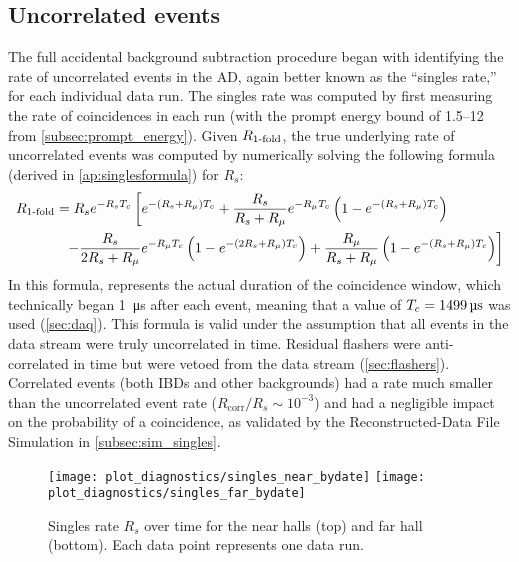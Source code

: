 \subsection{Uncorrelated events}
\label{subsec:singles}

The full accidental background subtraction procedure began with identifying
the rate of uncorrelated events in the AD, again better known
as the ``singles rate,'' for each individual data run.
The singles rate was computed by first measuring the rate of
 coincidences in each run
(with the prompt energy bound of \SIrange{1.5}{12}{\mev} from \cref{subsec:prompt_energy}).
Given $R_\text{\ensuremath{1}-fold}$, the true underlying rate of uncorrelated events was
computed by numerically solving the following formula
(derived in \cref{ap:singlesformula}) for $R_s$:
\begin{align}
    \label{eq:rsingles}
    \begin{split}
        R_{\text{\fold{1}}}
          &= R_s e^{-R_s\tc}
          \left[
              e^{-(R_s + R_\mu)\tc} +
              \frac{R_s}{R_s+R_\mu} e^{-R_\mu\tc}
              \left(
                  1 - e^{-(R_s + R_\mu)\tc}
              \right)
          \right. \\
          &\ \ %
          \left. - \frac{R_s}{2R_s + R_\mu} e^{-R_\mu\tc}
              \left(
                  1 - e^{-(2R_s + R_\mu)\tc}
              \right) +
              \frac{R_\mu}{R_s + R_\mu}
              \left(
                  1 - e^{-(R_s + R_\mu)\tc}
              \right)
          \right]
    \end{split}
\end{align}
In this formula, \tc{} represents the actual duration of the coincidence window,
which technically began \SI{1}{\micro\second} after each event,
meaning that a value of $T_c=\SI{1499}{\micro\second}$ was used (\cref{sec:daq}).
This formula is valid under the assumption that all
events in the data stream were truly uncorrelated in time.
Residual flashers were anti-correlated in time
but were vetoed from the data stream (\cref{sec:flashers}).
Correlated events (both IBDs and other backgrounds)
had a rate much smaller than the uncorrelated event rate
($R_{\text{corr}}/R_s \sim 10^{-3}$)
and had a negligible impact on the probability of a  coincidence,
as validated by the Reconstructed-Data File Simulation in \cref{subsec:sim_singles}.

\begin{figure}
    \centering
    \texttt{[image: plot\_diagnostics/singles\_near\_bydate]}
    \texttt{[image: plot\_diagnostics/singles\_far\_bydate]}
    \caption[Singles rate over time]{
        Singles rate $R_s$ over time for
        the near halls (top) and far hall (bottom).
        Each data point represents one data run.
    }
    \label{fig:singles}
\end{figure}

